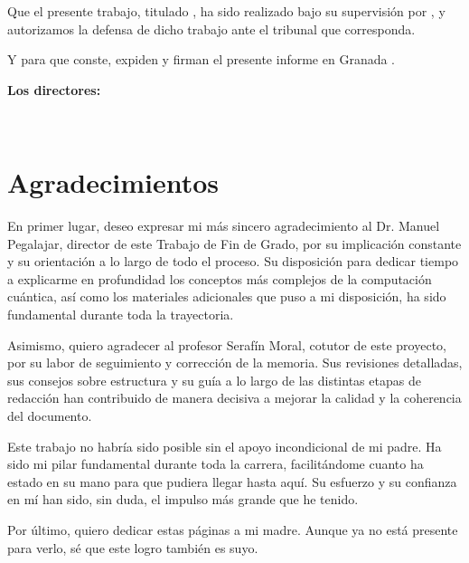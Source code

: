 Que el presente trabajo, titulado \textit{\textbf{\myTitle}},
ha sido realizado bajo su supervisión por \textbf{\myName}, y autorizamos la defensa de dicho trabajo ante el tribunal
que corresponda.

\vspace{0.5cm}

Y para que conste, expiden y firman el presente informe en Granada \myTime.

\vspace{1cm}

\textbf{Los directores:}

\vspace{2cm}

\noindent \textbf{\myProf} \ \ \ \ \ \textbf{\myOtherProf}

\chapter*{Agradecimientos}

\vspace{1cm}


En primer lugar, deseo expresar mi más sincero agradecimiento al Dr. Manuel Pegalajar, director de este Trabajo de Fin de Grado, por su implicación constante y su orientación a lo largo de todo el proceso. Su disposición para dedicar tiempo a explicarme en profundidad los conceptos más complejos de la computación cuántica, así como los materiales adicionales que puso a mi disposición, ha sido fundamental durante toda la trayectoria.

Asimismo, quiero agradecer al profesor Serafín Moral, cotutor de este proyecto, por su labor de seguimiento y corrección de la memoria. Sus revisiones detalladas, sus consejos sobre estructura y su guía a lo largo de las distintas etapas de redacción han contribuido de manera decisiva a mejorar la calidad y la coherencia del documento.

Este trabajo no habría sido posible sin el apoyo incondicional de mi padre. Ha sido mi pilar fundamental durante toda la carrera, facilitándome cuanto ha estado en su mano para que pudiera llegar hasta aquí. Su esfuerzo y su confianza en mí han sido, sin duda, el impulso más grande que he tenido.

Por último, quiero dedicar estas páginas a mi madre. Aunque ya no está presente para verlo, sé que este logro también es suyo.


